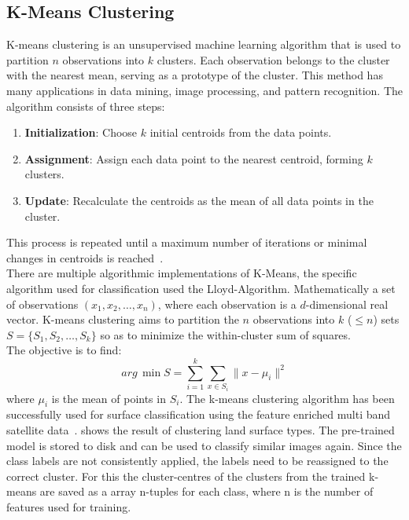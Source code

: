 \documentclass[12pt,a4paper, english,twoside]{article}
\begin{document}
%
\newpage
  \subsection{K-Means Clustering}\label{sec:kmeans}
    K-means clustering is an unsupervised machine learning algorithm that is used to partition $n$ observations into $k$ clusters. 
    Each observation belongs to the cluster with the nearest mean, serving as a prototype of the cluster. 
    This method has many applications in data mining, image processing, and pattern recognition.
    The algorithm consists of three steps:
    \begin{enumerate}
        \item \textbf{Initialization}: Choose $k$ initial centroids from the data points.
        \item \textbf{Assignment}: Assign each data point to the nearest centroid, forming $k$ clusters.
        \item \textbf{Update}: Recalculate the centroids as the mean of all data points in the cluster. 
    \end{enumerate}
    This process is repeated until a maximum number of iterations or minimal changes in centroids is reached~\autocite{Sinaga2020}.\\ 
    There are multiple algorithmic implementations of K-Means, the specific algorithm used for classification used the Lloyd-Algorithm.
    Mathematically a set of observations $(x_1, x_2, \ldots, x_n)$, where each observation is a $d$-dimensional real vector.
    K-means clustering aims to partition the $n$ observations into $k$ ($\leq n$) sets $S = \{S_1, S_2, \ldots, S_k\}$ so as to minimize the within-cluster sum of squares. \\
    The objective is to find:
    \begin{equation}
        arg\,\min{S} = \sum_{i=1}^{k} \sum_{x \in S_i} \| x - \mu_i \|^2
    \end{equation}
    where $\mu_i$ is the mean of points in $S_i$.
    The k-means clustering algorithm has been successfully used for surface classification using the feature enriched multi band satellite data~\autocite[e.g.]{Burrough2000}.
     shows the result of clustering land surface types. 
%
    The pre-trained model is stored to disk and can be used to classify similar images again. 
    Since the class labels are not consistently applied, the labels need to be reassigned to the correct cluster.
    For this the cluster-centres of the clusters from the trained k-means are saved as a array n-tuples for each class, where n is the number of features used for training.
    \newpage
\end{document}
